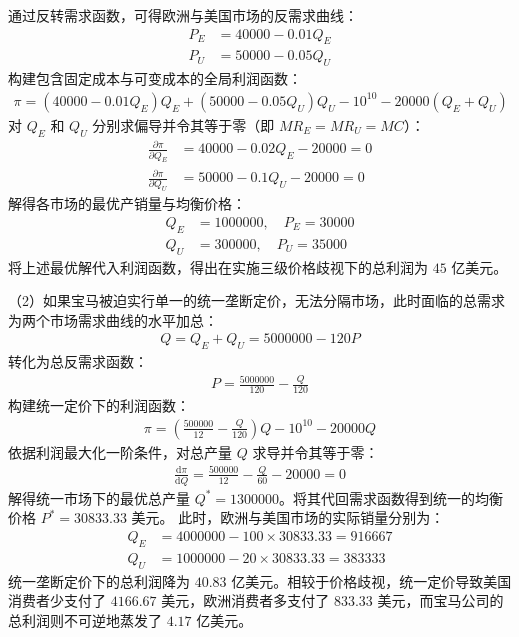 \begin{enumerate}[label=\textbf{\arabic*.}, leftmargin=*]
		通过反转需求函数，可得欧洲与美国市场的反需求曲线：
		\[
		\begin{aligned}
			P_E &= 40000 - 0.01Q_E \\
			P_U &= 50000 - 0.05Q_U
		\end{aligned}
		\]
		构建包含固定成本与可变成本的全局利润函数：
		\[
		\begin{aligned}
			\pi = (40000 - 0.01Q_E)Q_E + (50000 - 0.05Q_U)Q_U - 10^{10} - 20000(Q_E + Q_U)
		\end{aligned}
		\]
		对 $Q_E$ 和 $Q_U$ 分别求偏导并令其等于零（即 $MR_E = MR_U = MC$）：
		\[
		\begin{aligned}
			\frac{\partial \pi}{\partial Q_E} &= 40000 - 0.02Q_E - 20000 = 0 \\
			\frac{\partial \pi}{\partial Q_U} &= 50000 - 0.1Q_U - 20000 = 0
		\end{aligned}
		\]
		解得各市场的最优产销量与均衡价格：
		\[
		\begin{aligned}
			Q_E &= 1000000, \quad P_E = 30000 \\
			Q_U &= 300000, \quad P_U = 35000
		\end{aligned}
		\]
		将上述最优解代入利润函数，得出在实施三级价格歧视下的总利润为 $45$ 亿美元。
		
		（2）如果宝马被迫实行单一的统一垄断定价，无法分隔市场，此时面临的总需求为两个市场需求曲线的水平加总：
		\[
		\begin{aligned}
			Q = Q_E + Q_U = 5000000 - 120P
		\end{aligned}
		\]
		转化为总反需求函数：
		\[
		\begin{aligned}
			P = \frac{5000000}{120} - \frac{Q}{120}
		\end{aligned}
		\]
		构建统一定价下的利润函数：
		\[
		\begin{aligned}
			\pi = \left( \frac{500000}{12} - \frac{Q}{120} \right)Q - 10^{10} - 20000Q
		\end{aligned}
		\]
		依据利润最大化一阶条件，对总产量 $Q$ 求导并令其等于零：
		\[
		\begin{aligned}
			\frac{\mathrm{d}\pi}{\mathrm{d}Q} = \frac{500000}{12} - \frac{Q}{60} - 20000 = 0
		\end{aligned}
		\]
		解得统一市场下的最优总产量 $Q^* = 1300000$。将其代回需求函数得到统一的均衡价格 $P^* = 30833.33$ 美元。
		此时，欧洲与美国市场的实际销量分别为：
		\[
		\begin{aligned}
			Q_E &= 4000000 - 100 \times 30833.33 = 916667 \\
			Q_U &= 1000000 - 20 \times 30833.33 = 383333
		\end{aligned}
		\]
		统一垄断定价下的总利润降为 $40.83$ 亿美元。相较于价格歧视，统一定价导致美国消费者少支付了 $4166.67$ 美元，欧洲消费者多支付了 $833.33$ 美元，而宝马公司的总利润则不可逆地蒸发了 $4.17$ 亿美元。
		

\end{enumerate}
